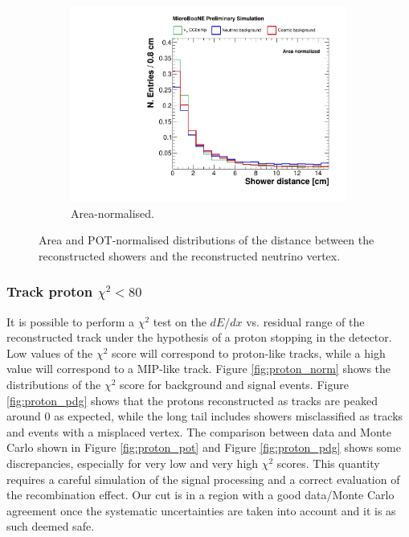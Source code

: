 \begin{figure}[htbp]
\begin{subfigure}{0.49\textwidth}
    \includegraphics[width=\linewidth]{figures/h_shower_distance_norm.pdf}
    \caption{Area-normalised.} \label{fig:showerd_norm}
  \end{subfigure}
  \caption{Area and POT-normalised distributions of the distance between the reconstructed showers and the reconstructed neutrino vertex.}
\end{figure}

\subsubsection*{Track proton $\chi^2 < 80$}
It is possible to perform a $\chi^2$ test on the $dE/dx$ vs. residual range of the reconstructed track under the hypothesis of a proton stopping in the detector. Low values of the $\chi^2$ score will correspond to proton-like tracks, while a high value will correspond to a MIP-like track. Figure \ref{fig:proton_norm} shows the distributions of the $\chi^2$ score for background and signal events. Figure \ref{fig:proton_pdg} shows that the protons reconstructed as tracks are peaked around 0 as expected, while the long tail includes showers misclassified as tracks and events with a misplaced vertex. The comparison between data and Monte Carlo shown in Figure \ref{fig:proton_pot} and Figure \ref{fig:proton_pdg} shows some discrepancies, especially for very low and very high $\chi^2$ scores. This quantity requires a careful simulation of the signal processing and a correct evaluation of the recombination effect. Our cut is in a region with a good data/Monte Carlo agreement once the systematic uncertainties are taken into account and it is as such deemed safe.

